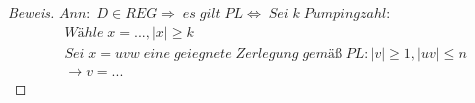 \begin{proof}[Beweis]
	\begin{math}
		Ann:\;D\in REG\Rightarrow\;es\;gilt\;PL\Leftrightarrow\;Sei\;k\;Pumpingzahl:
	\end{math}
	\begin{align*}
		&Wähle\;x=...,\mid x\mid\ge k\\
		&Sei\;x=uvw\;eine\;geiegnete\;Zerlegung\;gemäß\;PL:\mid v\mid\ge1,\mid uv\mid\le n\\
		&\rightarrow v=...
	\end{align*}
\end{proof}